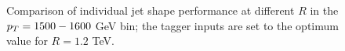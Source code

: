 \begin{figure}
\begin{center}
\caption{Comparison of individual jet shape performance at different $R$ in the $p_T=1500-1600$ GeV bin; the tagger inputs are set to the optimum value for $R=1.2$ TeV.}
\label{fig:Rcomparison_singleshape_top_optOnce}
\end{center}
\end{figure}

